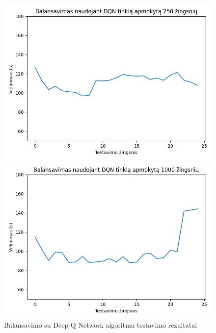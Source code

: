 \documentclass{VUMIFPSbakalaurinis}
\begin{document}
\begin{figure}[H]
\begin{minipage}[b]{0.45\textwidth}
        \includegraphics[width=\textwidth]{img/dqn_250_2.png}
    \end{minipage}
    \hspace{1mm}
    \begin{minipage}[b]{0.45\textwidth}
        \includegraphics[width=\textwidth]{img/dqn_1000_2.png}
    \end{minipage}
    \caption{Balansavimo su Deep Q Network algoritmu testavimo rezultatai}
    \label{dqn–rez}
\end{figure}
\end{document}
